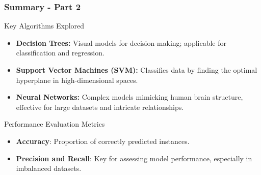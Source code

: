\documentclass[aspectratio=169]{beamer}
\begin{document}
\begin{frame}[fragile]
    \frametitle{Summary - Part 2}
    \begin{block}{Key Algorithms Explored}
        \begin{itemize}
            \item \textbf{Decision Trees:} Visual models for decision-making; applicable for classification and regression.
            \item \textbf{Support Vector Machines (SVM):} Classifies data by finding the optimal hyperplane in high-dimensional spaces.
            \item \textbf{Neural Networks:} Complex models mimicking human brain structure, effective for large datasets and intricate relationships.
        \end{itemize}
    \end{block}

    \begin{block}{Performance Evaluation Metrics}
        \begin{itemize}
            \item \textbf{Accuracy}: Proportion of correctly predicted instances.
            \item \textbf{Precision and Recall}: Key for assessing model performance, especially in imbalanced datasets.
        \end{itemize}
    \end{block}
\end{frame}
\end{document}
